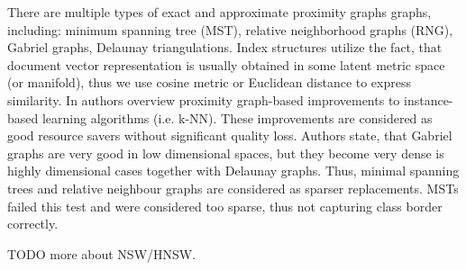 There are multiple types of exact and approximate proximity graphs graphs, including: minimum spanning tree (MST), relative neighborhood graphs (RNG), Gabriel graphs, Delaunay triangulations.
Index structures utilize the fact, that document vector representation is usually obtained in some latent metric space (or manifold), thus we use cosine metric or Euclidean distance to express similarity.
In \cite{ProximityGraphSurvey} authors overview proximity graph-based improvements to instance-based learning algorithms (i.e. k-NN). These improvements are considered as good resource savers without significant quality loss. Authors state, that Gabriel graphs are very good in low dimensional spaces, but they become very dense is highly dimensional cases together with Delaunay graphs. Thus, minimal spanning trees and relative neighbour graphs are considered as sparser replacements. MSTs failed this test and were considered too sparse, thus not capturing class border correctly.

TODO more about NSW/HNSW.